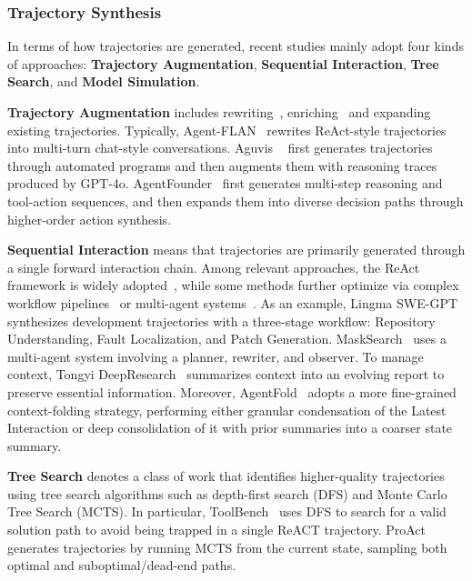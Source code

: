 \subsubsection{Trajectory Synthesis}
\label{sec:Trajectory_synthesis}
In terms of how trajectories are generated, recent studies mainly adopt four kinds of approaches: \textbf{Trajectory Augmentation}, \textbf{Sequential Interaction}, \textbf{Tree Search}, and \textbf{Model Simulation}.


\textbf{Trajectory Augmentation} includes rewriting~\cite{Agent-FLAN}, enriching~\cite{Aguvis,UI-TARS,SIMA2} and expanding~\cite{AgentFounder} existing trajectories. Typically, Agent-FLAN~\cite{Agent-FLAN} rewrites ReAct-style trajectories into multi-turn chat-style conversations. Aguvis ~\cite{Aguvis} first generates trajectories through automated programs and then augments them with reasoning traces produced by GPT-4o. AgentFounder~\cite{AgentFounder} first generates multi-step reasoning and tool-action sequences, and then expands them into diverse decision paths through higher-order action synthesis.


\textbf{Sequential Interaction} means that trajectories are primarily generated through a single forward interaction chain. Among relevant approaches, the ReAct framework is widely adopted~\cite{AgentTuning, WebDancer, VSearcher}, while some methods further optimize via complex workflow pipelines~\cite{Lingma_SWE-GPT} or multi-agent systems~\cite{FlowReasoner, MaskSearch, WebWeaver, O-Researcher}. As an example, Lingma SWE-GPT~\cite{Lingma_SWE-GPT} synthesizes development trajectories with a three-stage workflow: Repository Understanding, Fault Localization, and Patch Generation. MaskSearch~\cite{MaskSearch} uses a multi-agent system involving a planner, rewriter, and observer. To manage context, Tongyi DeepResearch~\cite{Tongyi_DeepResearch} summarizes context into an evolving report to preserve essential information. Moreover, AgentFold~\cite{AgentFold} adopts a more fine-grained context-folding strategy, performing either granular condensation of the Latest Interaction or deep consolidation of it with prior summaries into a coarser state summary.


\textbf{Tree Search} denotes a class of work that identifies higher-quality trajectories using tree search algorithms such as depth-first search (DFS) and Monte Carlo Tree Search (MCTS). In particular, ToolBench~\cite{ToolBench} uses DFS to search for a valid solution path to avoid being trapped in a single ReACT trajectory. ProAct~\cite{ProAct} generates trajectories by running MCTS from the current state, sampling both optimal and suboptimal/dead-end paths.


